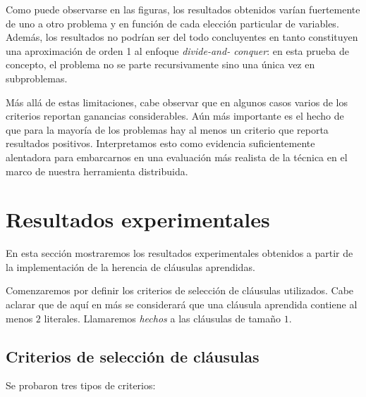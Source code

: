 Como puede observarse en las figuras, los resultados obtenidos varían
fuertemente de uno a otro problema y en función de cada elección particular de
variables. Además, los resultados no podrían ser del todo concluyentes en
tanto constituyen una aproximación de orden 1 al enfoque \emph{divide-and-
conquer}: en esta prueba de concepto, el problema no se parte recursivamente
sino una única vez en subproblemas.

Más allá de estas limitaciones, cabe observar que en algunos casos varios de
los criterios reportan ganancias considerables. Aún más importante es el hecho
de que para la mayoría de los problemas hay al menos un criterio que reporta
resultados positivos. Interpretamos esto como evidencia suficientemente
alentadora para embarcarnos en una evaluación más realista de la técnica
en el marco de nuestra herramienta distribuida.

\section{Resultados experimentales}

En esta sección mostraremos los resultados experimentales obtenidos a partir
de la implementación de la herencia de cláusulas aprendidas.

Comenzaremos por definir los criterios de selección de cláusulas utilizados.
Cabe aclarar que de aquí en más se considerará que una cláusula aprendida
contiene al menos $2$ literales. Llamaremos \emph{hechos} a las cláusulas de
tamaño $1$.

\subsection{Criterios de selección de cláusulas}

Se probaron tres tipos de criterios:

